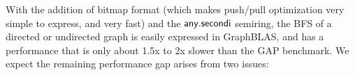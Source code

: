 


With the addition of bitmap format (which makes push/pull optimization very
simple to express, and very fast) and the $\mathbin{\mathsf{any.secondi}}$ %
semiring, the BFS of a
directed or undirected graph is easily expressed in GraphBLAS, and has a
performance that is only about 1.5x to 2x slower than the GAP benchmark.  We expect
the remaining performance gap arises from two issues:

